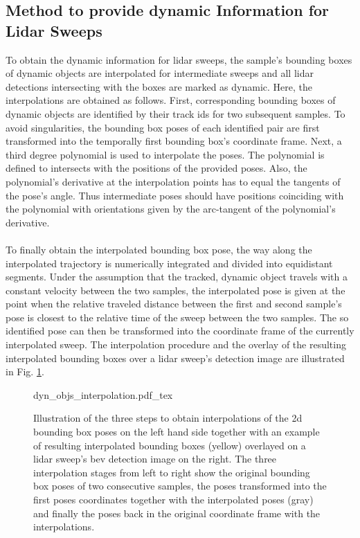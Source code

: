\subsection{Method to provide dynamic Information for Lidar Sweeps}
\label{subsec:method_dyn_info_for_lidar}
To obtain the dynamic information for lidar sweeps, the sample's bounding boxes of dynamic objects are interpolated for intermediate sweeps and all lidar detections intersecting with the boxes are marked as dynamic. Here, the interpolations are obtained as follows. First, corresponding bounding boxes of dynamic objects are identified by their track ids for two subsequent samples. To avoid singularities, the bounding box poses of each identified pair are first transformed into the temporally first bounding box's coordinate frame. Next, a third degree polynomial is used to interpolate the poses. The polynomial is defined to intersects with the positions of the provided poses. Also, the polynomial's derivative at the interpolation points has to equal the tangents of the pose's angle. Thus intermediate poses should have  positions coinciding with the polynomial with orientations given by the arc-tangent of the polynomial's derivative.
\\\\
To finally obtain the interpolated bounding box pose, the way along the interpolated trajectory is numerically integrated and divided into equidistant segments. Under the assumption that the tracked, dynamic object travels with a constant velocity between the two samples, the interpolated pose is given at the point when the relative traveled distance between the first and second sample's pose is closest to the relative time of the sweep between the two samples. The so identified pose can then be transformed into the coordinate frame of the currently interpolated sweep. The interpolation procedure and the overlay of the resulting interpolated bounding boxes over a lidar sweep's detection image are illustrated in Fig. \ref{fig:dyn_objs_interpolation}.
\begin{figure}[H]
	\begin{center}
		{dyn_objs_interpolation.pdf_tex}
		\caption{\label{fig:dyn_objs_interpolation}Illustration of the three steps to obtain interpolations of the 2d bounding box poses on the left hand side together with an example of resulting interpolated bounding boxes (yellow) overlayed on a lidar sweep's \gls{bev} detection image on the right. The three interpolation stages from left to right show the original bounding box poses of two consecutive samples, the poses transformed into the first poses coordinates together with the interpolated poses (gray) and finally the poses back in the original coordinate frame with the interpolations.}
	\end{center}
\end{figure} 
%
